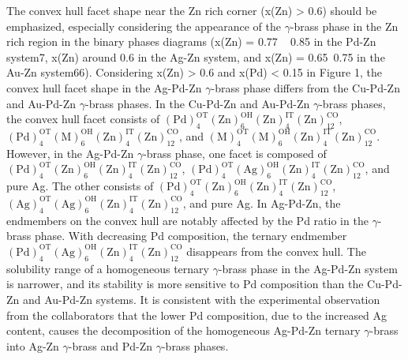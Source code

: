 The convex hull facet shape near the Zn rich corner (x(Zn) > 0.6) should be emphasized, especially considering the appearance of the $\gamma$-brass phase in the Zn rich region in the binary phases diagrams (x(Zn) = 0.77 ~ 0.85 in the Pd-Zn system7, x(Zn) around 0.6 in the Ag-Zn system, and x(Zn) = 0.65~0.75 in the Au-Zn system66). Considering x(Zn) > 0.6 and x(Pd) < 0.15 in Figure 1, the convex hull facet shape in the Ag-Pd-Zn $\gamma$-brass phase differs from the Cu-Pd-Zn and Au-Pd-Zn $\gamma$-brass phases. In the Cu-Pd-Zn and Au-Pd-Zn $\gamma$-brass phases, the convex hull facet consists of $\mathrm{\left(Pd\right)_4^{OT}\left(Zn\right)_6^{OH}\left(Zn\right)_4^{IT}\left(Zn\right)_{12}^{CO}}$, $\mathrm{\left(Pd\right)_4^{OT}\left(M\right)_6^{OH}\left(Zn\right)_4^{IT}\left(Zn\right)_{12}^{CO}}$, and $\mathrm{\left(M\right)_4^{OT}\left(M\right)_6^{OH}\left(Zn\right)_4^{IT}\left(Zn\right)_{12}^{CO}}$. However, in the Ag-Pd-Zn $\gamma$-brass phase, one facet is composed of $\mathrm{\left(Pd\right)_4^{OT}\left(Zn\right)_6^{OH}\left(Zn\right)_4^{IT}\left(Zn\right)_{12}^{CO}}$, $\mathrm{\left(Pd\right)_4^{OT}\left(Ag\right)_6^{OH}\left(Zn\right)_4^{IT}\left(Zn\right)_{12}^{CO}}$, and pure Ag. The other consists of $\mathrm{\left(Pd\right)_4^{OT}\left(Zn\right)_6^{OH}\left(Zn\right)_4^{IT}\left(Zn\right)_{12}^{CO}}$, $\mathrm{\left(Ag\right)_4^{OT}\left(Ag\right)_6^{OH}\left(Zn\right)_4^{IT}\left(Zn\right)_{12}^{CO}}$, and pure Ag. In Ag-Pd-Zn, the endmembers on the convex hull are notably affected by the Pd ratio in the $\gamma$-brass phase. With decreasing Pd composition, the ternary endmember $\mathrm{\left(Pd\right)_4^{OT}\left(Ag\right)_6^{OH}\left(Zn\right)_4^{IT}\left(Zn\right)_{12}^{CO}}$ disappears from the convex hull. The solubility range of a homogeneous ternary $\gamma$-brass phase in the Ag-Pd-Zn system is narrower, and its stability is more sensitive to Pd composition than the Cu-Pd-Zn and Au-Pd-Zn systems. It is consistent with the experimental observation from the collaborators that the lower Pd composition, due to the increased Ag content, causes the decomposition of the homogeneous Ag-Pd-Zn ternary $\gamma$-brass into Ag-Zn $\gamma$-brass and Pd-Zn $\gamma$-brass phases.   

